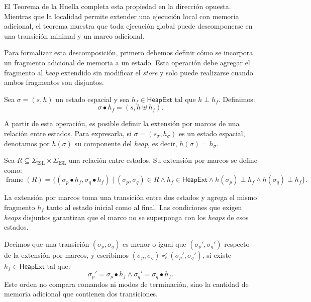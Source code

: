 \documentclass[a4paper,	11pt]{report}
\begin{document}
El Teorema de la Huella completa esta propiedad en la dirección opuesta.
Mientras que la localidad permite extender una ejecución local con memoria adicional,
el teorema muestra que toda ejecución global puede descomponerse en una transición minimal y un marco adicional.

Para formalizar esta descomposición,
primero debemos definir cómo se incorpora un fragmento adicional de memoria a un estado.
Esta operación debe agregar el fragmento al \emph{heap} extendido sin modificar el \emph{store}
y solo puede realizarse cuando ambos fragmentos son disjuntos.

\begin{definicion}
\label{def:state-ext}
Sea $\sigma = (s, h)$ un estado espacial y sea $h_f \in \mathsf{HeapExt}$ tal que $h \perp h_f$.
Definimos:
$$\sigma \bullet h_f = (s, h \uplus h_f).$$
\end{definicion}

A partir de esta operación,
es posible definir la extensión por marcos de una relación entre estados.
Para expresarla,
si $\sigma = (s_\sigma,h_\sigma)$ es un estado espacial,
denotamos por $h(\sigma)$ su componente del \emph{heap},
es decir, $h(\sigma) = h_\sigma$.

\begin{definicion}
\label{def:frame-ext}
Sea $R \subseteq \Sigma_\mathrm{ISL} \times \Sigma_\mathrm{ISL}$ una relación entre estados.
Su extensión por marcos se define como:
$$\operatorname{frame}(R) = \{(\sigma_p \bullet h_f, \sigma_q \bullet h_f) \mid (\sigma_p, \sigma_q) \in R
\land h_f \in \mathsf{HeapExt} \land h(\sigma_p) \perp h_f \land h(\sigma_q) \perp h_f\}.$$
\end{definicion}

La extensión por marcos toma una transición entre dos estados
y agrega el mismo fragmento $h_f$ tanto al estado inicial como al final.
Las condiciones que exigen \emph{heaps} disjuntos garantizan que el marco no se superponga con los \emph{heaps} de esos estados.

Decimos que una transición $(\sigma_p, \sigma_q)$ es menor o igual que $(\sigma_p', \sigma_q')$ respecto de la extensión por marcos,
y escribimos $(\sigma_p, \sigma_q) \preceq (\sigma_p', \sigma_q')$,
si existe $h_f \in \mathsf{HeapExt}$ tal que:
$$\sigma_p' = \sigma_p \bullet h_f \land \sigma_q' = \sigma_q \bullet h_f.$$
Este orden no compara comandos ni modos de terminación,
sino la cantidad de memoria adicional que contienen dos transiciones.
\end{document}
